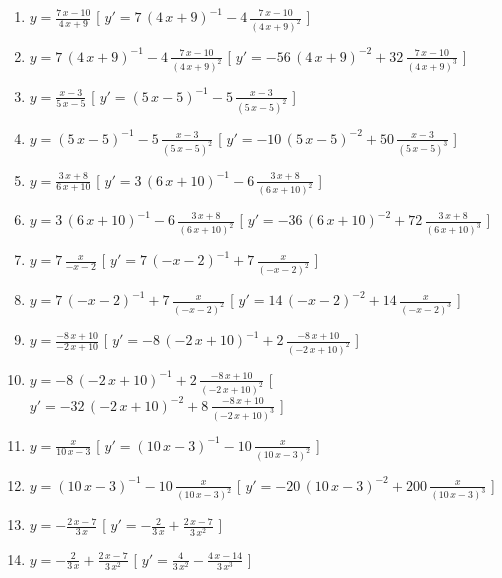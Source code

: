 \begin{esercizio}
\begin{enumerate}
\item $y= {\frac {7\,x-10}{4\,x+9}} $ \hfill [ $y'= 7\, \left( 4\,x+9 \right) ^{-1}-4\,{\frac {7\,x-10}{ \left( 4\,x+9 \right) ^{2}}}$ ]
\item $y= 7\, \left( 4\,x+9 \right) ^{-1}-4\,{\frac {7\,x-10}{ \left( 4\,x+9 \right) ^{2}}} $ \hfill [ $y'= -56\, \left( 4\,x+9 \right) ^{-2}+32\,{\frac {7\,x-10}{ \left( 4\,x+9 \right) ^{3}}}$ ]
\item $y= {\frac {x-3}{5\,x-5}} $ \hfill [ $y'=  \left( 5\,x-5 \right) ^{-1}-5\,{\frac {x-3}{ \left( 5\,x-5 \right) ^{2}}}$ ]
\item $y=  \left( 5\,x-5 \right) ^{-1}-5\,{\frac {x-3}{ \left( 5\,x-5 \right) ^{2}}} $ \hfill [ $y'= -10\, \left( 5\,x-5 \right) ^{-2}+50\,{\frac {x-3}{ \left( 5\,x-5 \right) ^{3}}}$ ]
\item $y= {\frac {3\,x+8}{6\,x+10}} $ \hfill [ $y'= 3\, \left( 6\,x+10 \right) ^{-1}-6\,{\frac {3\,x+8}{ \left( 6\,x+10 \right) ^{2}}}$ ]
\item $y= 3\, \left( 6\,x+10 \right) ^{-1}-6\,{\frac {3\,x+8}{ \left( 6\,x+10 \right) ^{2}}} $ \hfill [ $y'= -36\, \left( 6\,x+10 \right) ^{-2}+72\,{\frac {3\,x+8}{ \left( 6\,x+10 \right) ^{3}}}$ ]
\item $y= 7\,{\frac {x}{-x-2}} $ \hfill [ $y'= 7\, \left( -x-2 \right) ^{-1}+7\,{\frac {x}{ \left( -x-2 \right) ^{2}}}$ ]
\item $y= 7\, \left( -x-2 \right) ^{-1}+7\,{\frac {x}{ \left( -x-2 \right) ^{2}}} $ \hfill [ $y'= 14\, \left( -x-2 \right) ^{-2}+14\,{\frac {x}{ \left( -x-2 \right) ^{3}}}$ ]
\item $y= {\frac {-8\,x+10}{-2\,x+10}} $ \hfill [ $y'= -8\, \left( -2\,x+10 \right) ^{-1}+2\,{\frac {-8\,x+10}{ \left( -2\,x+10 \right) ^{2}}}$ ]
\item $y= -8\, \left( -2\,x+10 \right) ^{-1}+2\,{\frac {-8\,x+10}{ \left( -2\,x+10 \right) ^{2}}} $ \hfill [ $y'= -32\, \left( -2\,x+10 \right) ^{-2}+8\,{\frac {-8\,x+10}{ \left( -2\,x+10 \right) ^{3}}}$ ]
\item $y= {\frac {x}{10\,x-3}} $ \hfill [ $y'=  \left( 10\,x-3 \right) ^{-1}-10\,{\frac {x}{ \left( 10\,x-3 \right) ^{2}}}$ ]
\item $y=  \left( 10\,x-3 \right) ^{-1}-10\,{\frac {x}{ \left( 10\,x-3 \right) ^{2}}} $ \hfill [ $y'= -20\, \left( 10\,x-3 \right) ^{-2}+200\,{\frac {x}{ \left( 10\,x-3 \right) ^{3}}}$ ]
\item $y= -{\frac {2\,x-7}{3\,x}} $ \hfill [ $y'= -{\frac {2}{3\,x}}+{\frac {2\,x-7}{3\,{x}^{2}}}$ ]
\item $y= -{\frac {2}{3\,x}}+{\frac {2\,x-7}{3\,{x}^{2}}} $ \hfill [ $y'= {\frac {4}{3\,{x}^{2}}}-{\frac {4\,x-14}{3\,{x}^{3}}}$ ]

\end{enumerate}
\end{esercizio}
